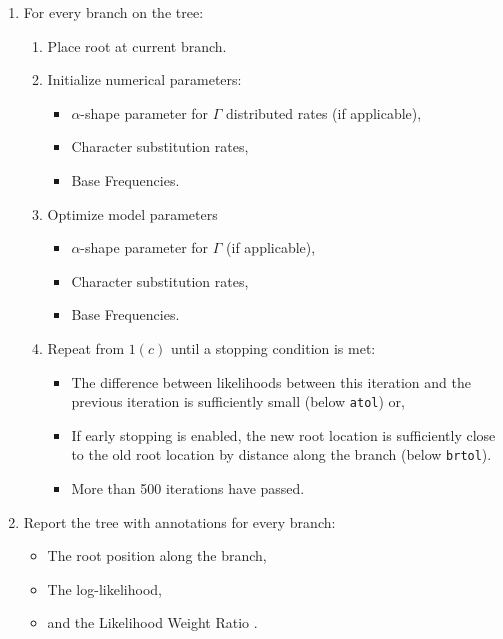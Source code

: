 \documentclass{article}
\begin{document}
\begin{enumerate}
    \item For every branch on the tree:
    \begin{enumerate}
      \item Place root at current branch.
      \item Initialize numerical parameters:
                \begin{itemize}
                  \item $\alpha$-shape parameter for $\Gamma$ distributed rates
                    (if applicable),
                  \item Character substitution rates,
                  \item Base Frequencies.
                \end{itemize}
          \item Optimize model parameters
                \begin{itemize}
                  \item $\alpha$-shape parameter for $\Gamma$ (if applicable),
                  \item Character substitution rates,
                  \item Base Frequencies.
                \end{itemize}
          \item Repeat from $1(c)$ until a stopping condition is met:
                \begin{itemize}
                  \item The difference between likelihoods between this
                        iteration and the previous iteration is sufficiently
                        small (below \texttt{atol}) or,
                  \item If early stopping is enabled, the new root location is
                        sufficiently close to the old root location by distance
                        along the branch (below \texttt{brtol}).
                  \item More than 500 iterations have passed.
                \end{itemize}
    \end{enumerate}
  \item Report the tree with annotations for every branch:
    \begin{itemize}
      \item The root position along the branch,
      \item The log-likelihood,
      \item and the Likelihood Weight Ratio \cite{strimmer_inferring_2002}.
    \end{itemize}
\end{enumerate}
\end{document}
